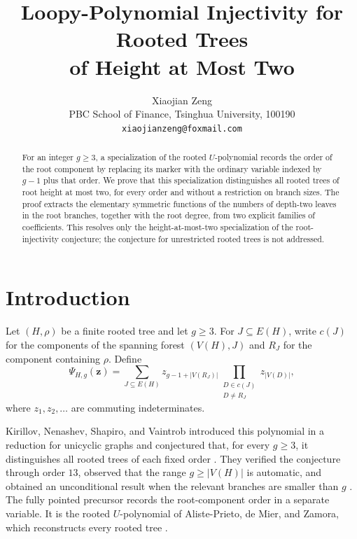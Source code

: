 \documentclass[11pt]{article}
\title{Loopy-Polynomial Injectivity for Rooted Trees\\of Height at Most Two}
\author{Xiaojian Zeng\\
PBC School of Finance, Tsinghua University, 100190\\
\texttt{xiaojianzeng@foxmail.com}}
\date{}
\newcommand{\PsiHG}{\Psi_{H,g}}
\begin{document}
\maketitle

\begin{abstract}
For an integer $g\geq 3$, a specialization of the rooted
$U$-polynomial records the order of the root component by replacing its
marker with the ordinary variable indexed by $g-1$ plus that order.  We
prove that this specialization distinguishes all rooted trees of root
height at most two, for every order and without a restriction on branch
sizes.  The proof extracts the elementary symmetric functions of the
numbers of depth-two leaves in the root branches, together with the root
degree, from two explicit families of coefficients.  This resolves only
the height-at-most-two specialization of the root-injectivity conjecture;
the conjecture for unrestricted rooted trees is not addressed.
\end{abstract}

\section{Introduction}

Let $(H,\rho)$ be a finite rooted tree and let $g\geq 3$.  For
$J\subseteq E(H)$, write $c(J)$ for the components of the spanning forest
$(V(H),J)$ and $R_J$ for the component containing $\rho$.  Define
\begin{equation}\label{eq:def}
 \PsiHG(\mathbf z)=
 \sum_{J\subseteq E(H)}
 z_{g-1+|V(R_J)|}
 \prod_{\substack{D\in c(J)\\D\neq R_J}}z_{|V(D)|},
\end{equation}
where $z_1,z_2,\ldots$ are commuting indeterminates.

Kirillov, Nenashev, Shapiro, and Vaintrob introduced this polynomial in a
reduction for unicyclic graphs and conjectured that, for every $g\geq3$,
it distinguishes all rooted trees of each fixed order
\cite[Conjecture~9.10]{KirillovEtAl2026}.  They verified the conjecture
through order $13$, observed that the range $g\geq |V(H)|$ is automatic,
and obtained an unconditional result when the relevant branches are
smaller than $g$ \cite[Remark~9.12 and Theorem~9.14]{KirillovEtAl2026}.
The fully pointed precursor records the root-component order in a separate
variable.  It is the rooted $U$-polynomial of Aliste-Prieto, de Mier, and
Zamora, which reconstructs every rooted tree
\cite[Theorem~9]{AlistePrietoDeMierZamora2021}.
\end{document}
